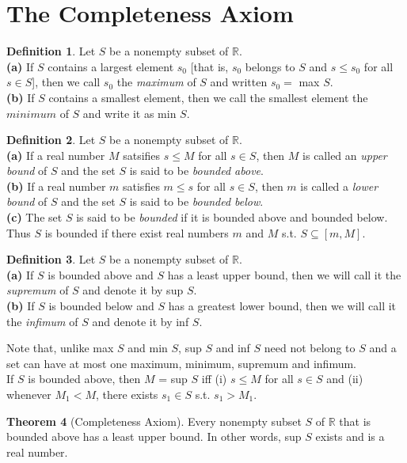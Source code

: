 \documentclass{book}
\theoremstyle{definition}
\newtheorem{definition}{Definition}[section]
\newtheorem{theorem}[definition]{Theorem}
\begin{document}
\section{The Completeness Axiom}
\begin{definition}
Let $S$ be a nonempty subset of $\mathbb{R}$.
\\ \textbf{(a)} If $S$ contains a largest element $s_0$ [that is, $s_0$ belongs to $S$ and $s \leq s_0$ for all $s \in S$], then we call $s_0$ the \textit{maximum} of $S$ and written $s_0 = $ max $S$.
\\ \textbf{(b)} If $S$ contains a smallest element, then we call the smallest element the $minimum$ of $S$ and write it as min $S$.
\end{definition}
\begin{definition}
Let $S$ be a nonempty subset of $\mathbb{R}$.
\\ \textbf{(a)} If a real number $M$ satsifies $s \leq M$ for all $s \in S$, then $M$ is called an \textit{upper bound} of $S$ and the set $S$ is said to be \textit{bounded above}.
\\ \textbf{(b)} If a real number $m$ satisfies $m \leq s$ for all $s \in S$, then $m$ is called a \textit{lower bound} of $S$ and the set $S$ is said to be \textit{bounded below}.
\\ \textbf{(c)} The set $S$ is said to be \textit{bounded} if it is bounded above and bounded below. Thus $S$ is bounded if there exist real numbers $m$ and $M$ s.t. $S \subseteq [m, M]$.
\end{definition}
\begin{definition}
Let $S$ be a nonempty subset of $\mathbb{R}$.
\\ \textbf{(a)} If $S$ is bounded above and $S$ has a least upper bound, then we will call it the \textit{supremum} of $S$ and denote it by sup $S$.
\\ \textbf{(b)} If $S$ is bounded below and $S$ has a greatest lower bound, then we will call it the \textit{infimum} of $S$ and denote it by inf $S$.
\end{definition}
Note that, unlike max $S$ and min $S$, sup $S$ and inf $S$ need not belong to $S$ and a set can have at most one maximum, minimum, supremum and infimum.
\\ If $S$ is bounded above, then $M$ = sup $S$ iff (i) $s \leq M$ for all $s \in S$ and (ii) whenever $M_1 < M$, there exists $s_1 \in S$ s.t. $s_1 > M_1$.
\begin{theorem}[Completeness Axiom]
Every nonempty subset $S$ of $\mathbb{R}$ that is bounded above has a least upper bound. In other words, sup $S$ exists and is a real number.
\end{theorem}
\end{document}
